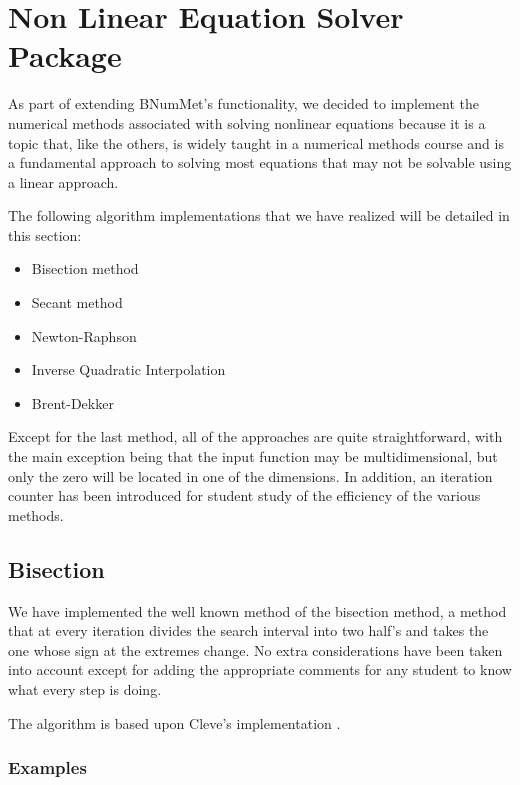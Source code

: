 \section{Non Linear Equation Solver Package}
As part of extending BNumMet's functionality, we decided to implement the numerical methods associated with solving nonlinear equations because it is a topic that, like the others, is widely taught in a numerical methods course and is a fundamental approach to solving most equations that may not be solvable using a linear approach.

The following algorithm implementations that we have realized will be detailed in this section:
\begin{itemize}
    \item Bisection method 
    \item Secant  method 
    \item Newton-Raphson 
    \item Inverse Quadratic Interpolation 
    \item Brent-Dekker  
\end{itemize}

Except for the last method, all of the approaches are quite straightforward, with the main exception being that the input function may be multidimensional, but only the zero will be located in one of the dimensions. In addition, an iteration counter has been introduced for student study of the efficiency of the various methods.

\subsection{Bisection}
We have implemented the well known method of the bisection method, a method that at every iteration divides the search interval into two half's and takes the one whose sign at the extremes change. No extra considerations have been taken into account except for adding the appropriate comments for any student to know what every step is doing.

The algorithm is based upon Cleve's implementation \cite{doi:10.1137/1.9780898717952}.
\subsubsection{Examples}
	

